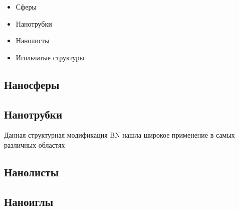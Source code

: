  

\begin{itemize}
    \item Сферы 
    \item Нанотрубки
    \item Нанолисты
    \item Игольчатые структуры
\end{itemize}

\subsection{Наносферы}%
\label{sub:Наносферы}


\subsection{Нанотрубки}%
\label{sub:Нанотрубки}


Данная структурная модификация BN нашла широкое применение в самых 
различных областях 

\subsection{Нанолисты}%
\label{sub:Нанолисты}

\subsection{Наноиглы}%
\label{sub:Наноиглы}



